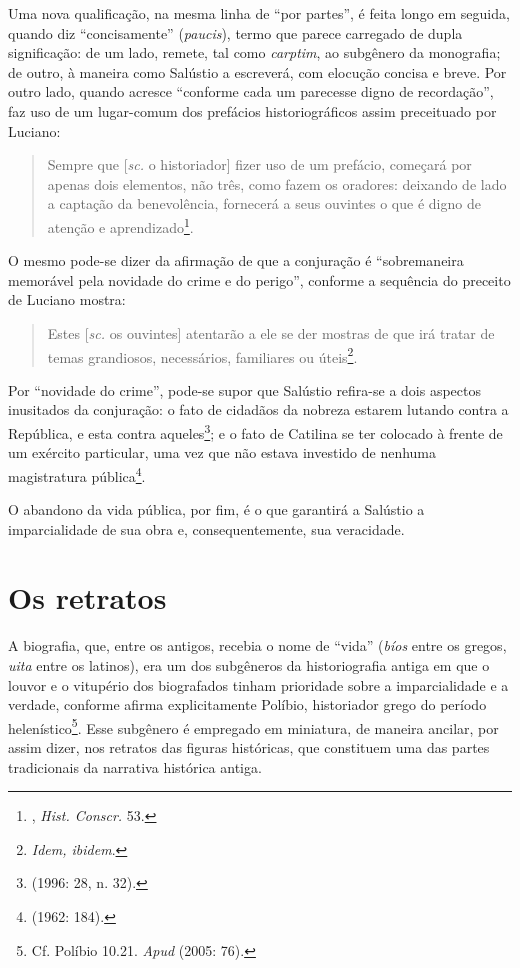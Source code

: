 Uma nova qualificação, na mesma linha de ``por partes'', é feita longo em
seguida, quando diz “concisamente” (\emph{paucis}), termo que parece carregado de dupla
significação: de um lado, remete, tal como \emph{carptim}, ao subgênero da
monografia; de outro, à maneira como Salústio a escreverá, com elocução concisa e breve. Por outro lado, quando acresce “conforme cada um
parecesse digno de recordação”, faz uso de um lugar-comum dos prefácios
historiográficos assim preceituado por Luciano:

 

\begin{quote} Sempre que [\emph{sc.} o historiador] fizer uso de um prefácio,
  começará por apenas dois elementos, não três, como fazem os oradores:
  deixando de lado a captação da benevolência, fornecerá a seus ouvintes o que
  é digno de atenção e aprendizado\footnote{ , \emph{Hist. Conscr.} 53.}. 

\end{quote}

O mesmo pode-se dizer da afirmação de que a conjuração é “sobremaneira
memorável pela novidade do crime e do perigo”, conforme a sequência do preceito
de Luciano mostra:

\begin{quote}

Estes [\emph{sc.} os ouvintes] atentarão a ele se der mostras de que irá tratar
de temas grandiosos, necessários, familiares ou úteis\footnote{\emph{Idem,
ibidem}.}.

\end{quote}

 
Por “novidade do crime”, pode-se supor que Salústio refira-se a dois
aspectos inusitados da conjuração: o fato de cidadãos da nobreza estarem
lutando contra a República, e esta contra aqueles\footnote{ (1996:
28, n. 32).}; e o fato de Catilina se ter colocado à frente de um exército
particular, uma vez que não estava investido de nenhuma magistratura
pública\footnote{  (1962: 184).}.

O abandono da vida pública, por fim, é o que garantirá a Salústio a imparcialidade de sua obra e, consequentemente, sua veracidade. 

\section{Os retratos}

A biografia, que, entre os antigos, recebia o nome de “vida” (\emph{bíos} entre
os gregos, \emph{uita} entre os latinos), era um dos subgêneros da
historiografia antiga em que o louvor e o vitupério dos biografados tinham
prioridade sobre a imparcialidade e a verdade, conforme afirma explicitamente
Políbio, historiador grego do período helenístico\footnote{ Cf. Políbio 10.21. \emph{Apud}  (2005: 76).}. 
Esse subgênero é empregado em miniatura, de maneira ancilar, por assim dizer, nos retratos das
figuras históricas, que constituem uma das partes tradicionais da narrativa
histórica antiga.

